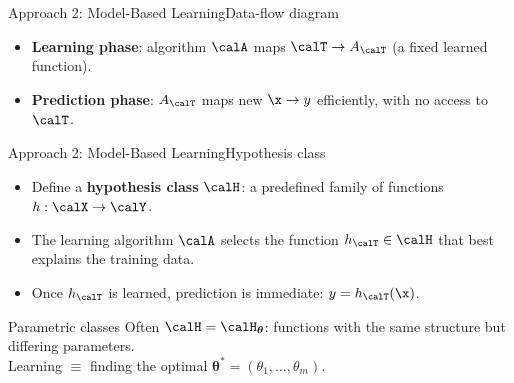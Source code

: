 \begin{frame}{Approach 2: Model-Based Learning}{Data-flow diagram}
  \begin{center}
  \end{center}
  \begin{itemize}
    \item \textbf{Learning phase}: algorithm $\calA$ maps $\calT \to A_\calT$ (a fixed
          learned function).
    \item \textbf{Prediction phase}: $A_\calT$ maps new $\x \to y$ efficiently, with no
          access to $\calT$.
  \end{itemize}
\end{frame}

\begin{frame}{Approach 2: Model-Based Learning}{Hypothesis class}
  \begin{itemize}
    \item Define a \textcolor{AccentBlue}{\textbf{hypothesis class}} $\calH$: a predefined
          family of functions $h : \calX \to \calY$.
    \item The learning algorithm $\calA$ selects the function $h_\calT \in \calH$ that best
          explains the training data.
    \item Once $h_\calT$ is learned, prediction is immediate: $y = h_\calT(\x)$.
  \end{itemize}
  \bigskip
  \begin{block}{Parametric classes}
    Often $\calH = \calH_{\boldsymbol\theta}$: functions with the same structure but
    differing parameters.\\
    Learning $\equiv$ finding the optimal
    $\boldsymbol\theta^* = (\theta_1, \ldots, \theta_m)$.
  \end{block}
\end{frame}

